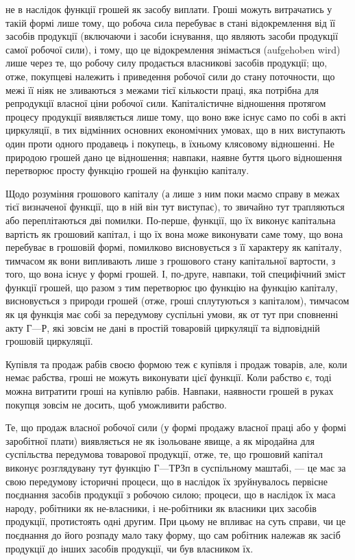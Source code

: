 \parcont{}  %
не в наслідок функції грошей як засобу виплати. Гроші можуть витрачатись
у такій формі лише тому, що робоча сила перебуває в стані відокремлення
від її засобів продукції (включаючи і засоби існування, що являють
засоби продукції самої робочої сили), і тому, що це відокремлення
знімається (aufgehoben wird) лише через те, що робочу силу продається
власникові засобів продукції; що, отже, покупцеві належить і приведення
робочої сили до стану поточности, що межі її ніяк не зливаються з
межами тієї кількости праці, яка потрібна для репродукції власної ціни
робочої сили. Капіталістичне відношення протягом процесу продукції
виявляється лише тому, що воно вже існує само по собі
в акті циркуляції, в тих відмінних основних економічних умовах, що в
них виступають один проти одного продавець і покупець, в їхньому клясовому
відношенні. Не природою грошей дано це відношення; навпаки,
наявне буття цього відношення перетворює просту функцію грошей на
функцію капіталу.

Щодо розуміння грошового капіталу (а лише з ним поки маємо
справу в межах тієї визначеної функції, що в ній він тут виступає), то
звичайно тут трапляються або переплітаються дві помилки. По-перше,
функції, що їх виконує капітальна вартість як грошовий капітал, і що
їх вона може виконувати саме тому, що вона перебуває в грошовій
формі, помилково висновується з її характеру як капіталу, тимчасом як
вони випливають лише з грошового стану капітальної вартости, з того,
що вона існує у формі грошей. І, по-друге, навпаки, той специфічний
зміст функції грошей, що разом з тим перетворює цю функцію на функцію
капіталу, висновується з природи грошей (отже, гроші сплутуються
з капіталом), тимчасом як ця функція має собі за передумову
суспільні умови, як от тут при сповненні акту $Г — Р$, які зовсім не
дані в простій товаровій циркуляції та відповідній грошовій циркуляції.

Купівля та продаж рабів своєю формою теж є купівля і продаж
товарів, але, коли немає рабства, гроші не можуть виконувати
цієї функції. Коли рабство є, тоді можна витратити гроші на
купівлю рабів. Навпаки, наявности грошей в руках покупця зовсім не
досить, щоб уможливити рабство.

Те, що продаж власної робочої сили (у формі продажу власної праці
або у формі заробітної плати) виявляється не як ізольоване явище,
а як міродайна для суспільства передумова товарової продукції, отже,
те, що грошовий капітал виконує розглядувану тут функцію $Г — Т Р Зп$
в суспільному маштабі, — це має за свою передумову історичні процеси,
що в наслідок їх зруйнувалось первісне поєднання засобів продукції з
робочою силою; процеси, що в наслідок їх маса народу, робітники як
не-власники, і не-робітники як власники цих засобів продукції, протистоять
одні другим. При цьому не впливає на суть справи, чи це поєднання
до його розпаду мало таку форму, що сам робітник належав як засіб
продукції до інших засобів продукції, чи був власником їх.

